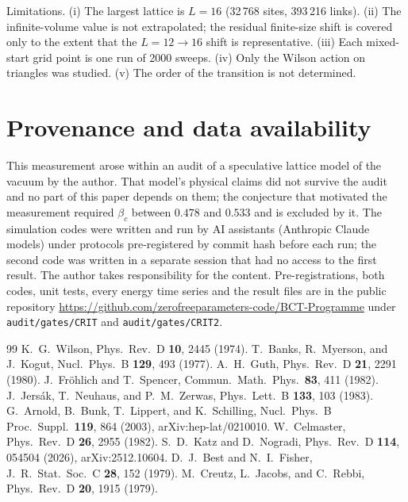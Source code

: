 \documentclass[aps,prd,twocolumn,superscriptaddress,floatfix,nofootinbib]{revtex4-2}
\begin{document}
Limitations. (i) The largest lattice is $L=16$ (32\,768 sites, 393\,216 links). (ii) The
infinite-volume value is not extrapolated; the residual finite-size shift is covered only to
the extent that the $L=12\to16$ shift is representative. (iii) Each mixed-start grid point is
one run of 2000 sweeps. (iv) Only the Wilson action on triangles was studied. (v) The order of
the transition is not determined.

\section{Provenance and data availability}

This measurement arose within an audit of a speculative lattice model of the vacuum by the
author. That model's physical claims did not survive the audit and no part of this paper
depends on them; the conjecture that
motivated the measurement required $\beta_c$ between $0.478$ and $0.533$ and is excluded by it. The simulation codes were written and run by AI assistants
(Anthropic Claude models) under protocols pre-registered by commit hash before each run; the
second code was written in a separate session that had no access to the first result. The
author takes responsibility for the content. Pre-registrations, both codes, unit tests, every
energy time series and the result files are in the public repository
\url{https://github.com/zerofreeparameters-code/BCT-Programme} under
\texttt{audit/gates/CRIT} and \texttt{audit/gates/CRIT2}.

\begin{thebibliography}{99}
 K.~G.~Wilson, Phys.\ Rev.\ D \textbf{10}, 2445 (1974).
 T.~Banks, R.~Myerson, and J.~Kogut, Nucl.\ Phys.\ B \textbf{129}, 493 (1977).
 A.~H.~Guth, Phys.\ Rev.\ D \textbf{21}, 2291 (1980).
 J.~Fr\"ohlich and T.~Spencer, Commun.\ Math.\ Phys.\ \textbf{83}, 411 (1982).
 J.~Jers\'ak, T.~Neuhaus, and P.~M.~Zerwas, Phys.\ Lett.\ B \textbf{133}, 103 (1983).
 G.~Arnold, B.~Bunk, T.~Lippert, and K.~Schilling, Nucl.\ Phys.\ B Proc.\ Suppl.\ \textbf{119}, 864 (2003), arXiv:hep-lat/0210010.
 W.~Celmaster, Phys.\ Rev.\ D \textbf{26}, 2955 (1982).
 S.~D.~Katz and D.~Nogradi, Phys.\ Rev.\ D \textbf{114}, 054504 (2026), arXiv:2512.10604.
 D.~J.~Best and N.~I.~Fisher, J.\ R.\ Stat.\ Soc.\ C \textbf{28}, 152 (1979).
 M.~Creutz, L.~Jacobs, and C.~Rebbi, Phys.\ Rev.\ D \textbf{20}, 1915 (1979).
\end{thebibliography}
\end{document}
